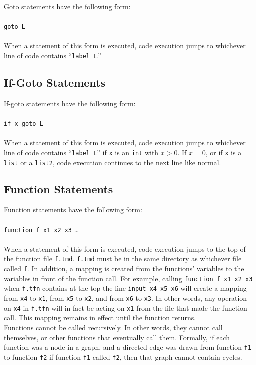 \documentclass[11pt]{report}
\begin{document}
Goto statements have the following form: \\ \\
\texttt{goto L} \\ \\ 
When a statement of this form is executed, code execution jumps to whichever line of code contains ``\texttt{label L}.''

\subsection{If-Goto Statements}

If-goto statements have the following form: \\ \\
\texttt{if x goto L} \\ \\ 
When a statement of this form is executed, code execution jumps to whichever line of code contains ``\texttt{label L}'' if \texttt{x} is an \texttt{int} with $x > 0$. If $x = 0$, or if \texttt{x} is a \texttt{list} or a \texttt{list2}, code execution continues to the next line like normal. \\

\subsection{Function Statements}

Function statements have the following form: \\ \\
\texttt{function f x1 x2 x3} \dots \\ \\ 
When a statement of this form is executed, code execution jumps to the top of the function file \texttt{f.tmd}. \texttt{f.tmd} must be in the same directory as whichever file called \texttt{f}. In addition, a mapping is created from the functions' variables to the variables in front of the function call. For example, calling \texttt{function f x1 x2 x3} when \texttt{f.tfn} contains at the top the line \texttt{input x4 x5 x6} will create a mapping from \texttt{x4} to \texttt{x1}, from \texttt{x5} to \texttt{x2}, and from \texttt{x6} to \texttt{x3}. In other words, any operation on \texttt{x4} in \texttt{f.tfn} will in fact be acting on \texttt{x1} from the file that made the function call. This mapping remains in effect until the function returns. \\

Functions cannot be called recursively. In other words, they cannot call themselves, or other functions that eventually call them. Formally, if each function was a node in a graph, and a directed edge was drawn from function \texttt{f1} to function \texttt{f2} if function \texttt{f1} called \texttt{f2}, then that graph cannot contain cycles.
\end{document}
